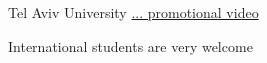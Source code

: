 \begin{frame}[label=intro-3]{Tel Aviv University \href{http://www.youtube.com/watch?v=rbUevEuYQHg}{ ...  promotional video}}
\begin{multicols}{2}
\centering
{} 
\end{multicols}
\end{frame}


\begin{frame}[label=intro-4]{International students are very welcome}
\begin{center}
\end{center}
\end{frame}

% 